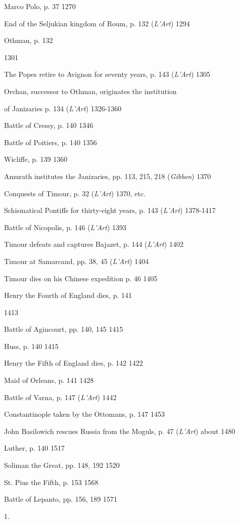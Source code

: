 Marco Polo, p. 37
1270

End of the Seljukian kingdom of Roum, p. 132 (\emph{L'Art})
1294

Othman, p. 132

1301

The Popes retire to Avignon for seventy years,
p. 143 (\emph{L'Art})
1305

Orchan, successor to Othman, originates the
institution

of Janizaries p. 134 (\emph{L'Art})
1326-1360

Battle of Cressy, p. 140
1346

Battle of Poitiers, p. 140
1356

Wicliffe, p. 139
1360

Amurath institutes the Janizaries, pp. 113,
215, 218 (\emph{Gibbon})
1370

Conquests of Timour, p. 32 (\emph{L'Art})
1370, etc.

Schismatical Pontiffs for thirty-eight years,
p. 143 (\emph{L'Art})
1378-1417

Battle of Nicopolis, p. 146 (\emph{L'Art})
1393

Timour defeats and captures Bajazet, p. 144 (\emph{L'Art})
1402

Timour at Samarcand, pp. 38, 45 (\emph{L'Art})
1404

Timour dies on his Chinese expedition p. 46
1405

Henry the Fourth of England dies, p. 141

1413

Battle of Agincourt, pp. 140, 145
1415

Huss, p. 140
1415

Henry the Fifth of England dies, p. 142
1422

Maid of Orleans, p. 141
1428

Battle of Varna, p. 147 (\emph{L'Art})
1442

Constantinople taken by the Ottomans, p. 147
1453

John Basilowich rescues Russia from the Moguls,
p. 47 (\emph{L'Art})
about 1480

Luther, p. 140
1517

Soliman the Great, pp. 148, 192
1520

St. Pius the Fifth, p. 153
1568

Battle of Lepanto, pp. 156, 189
1571


1.

